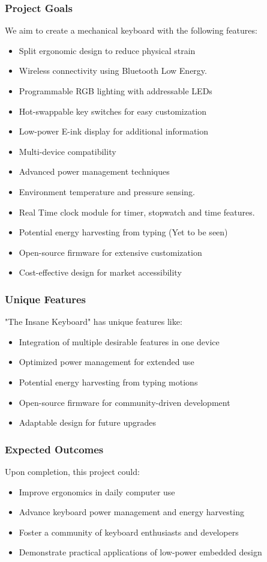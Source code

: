\documentclass[a4paper,11pt]{article}%
\begin{document}
\subsubsection{Project Goals}
We aim to create a mechanical keyboard with the following features:
\begin{itemize}
    \item Split ergonomic design to reduce physical strain
    \item Wireless connectivity using Bluetooth Low Energy.
    \item Programmable RGB lighting with addressable LEDs
    \item Hot-swappable key switches for easy customization
    \item Low-power E-ink display for additional information
    \item Multi-device compatibility
    \item Advanced power management techniques
    \item Environment temperature and pressure sensing.
    \item Real Time clock module for timer, stopwatch and time features.
    \item Potential energy harvesting from typing (Yet to be seen)
    \item Open-source firmware for extensive customization
    \item Cost-effective design for market accessibility
\end{itemize}

\subsubsection{Unique Features}
"The Insane Keyboard" has unique features like:
\begin{itemize}
    \item Integration of multiple desirable features in one device
    \item Optimized power management for extended use
    \item Potential energy harvesting from typing motions
    \item Open-source firmware for community-driven development
    \item Adaptable design for future upgrades
\end{itemize}

\subsubsection{Expected Outcomes}
Upon completion, this project could:
\begin{itemize}
    \item Improve ergonomics in daily computer use
    \item Advance keyboard power management and energy harvesting
    \item Foster a community of keyboard enthusiasts and developers
    \item Demonstrate practical applications of low-power embedded design
\end{itemize}
\end{document}
